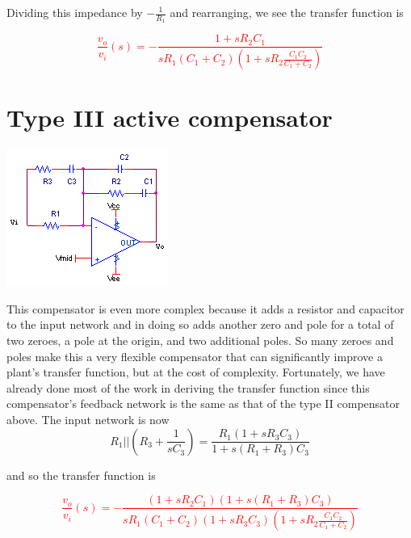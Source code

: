 Dividing this impedance by $-\frac{1}{R_{1}}$ and rearranging, we see the transfer function is

\textcolor{red}{
\begin{equation}
\frac{v_{o}}{v_{i}}(s) = -\frac{1+sR_{2}C_{1}}{sR_{1}(C_{1}+C_{2})(1+sR_{2}\frac{C_{1}C_{2}}{C_{1}+C_{2}})}
\label{eq:type2compensator}
\end{equation}
}

\section{Type III active compensator}
\begin{center}
	\includegraphics{schematics/type3compensator.PNG}
\end{center}
This compensator is even more complex because it adds a resistor and capacitor to the input network and in doing so adds another zero and pole for a total of two zeroes, a pole at the origin, and two additional poles. So many zeroes and poles make this a very flexible compensator that can significantly improve a plant's transfer function, but at the cost of complexity. Fortunately, we have already done most of the work in deriving the transfer function since this compensator's feedback network is the same as that of the type II compensator above. The input network is now
\begin{equation}
R_{1}||\left(R_{3}+\frac{1}{sC_{3}}\right) = \frac{R_{1}(1+sR_{3}C_{3})}{1+s(R_{1}+R_{3})C_{3}}
\end{equation}

and so the transfer function is

\textcolor{red}{
\begin{equation}
\frac{v_{o}}{v_{i}}(s) = -\frac{(1+sR_{2}C_{1})(1+s(R_{1}+R_{3})C_{3})}{sR_{1}(C_{1}+C_{2})(1+sR_{3}C_{3})(1+sR_{2}\frac{C_{1}C_{2}}{C_{1}+C_{2}})}
\label{eq:type3compensator}
\end{equation}
}